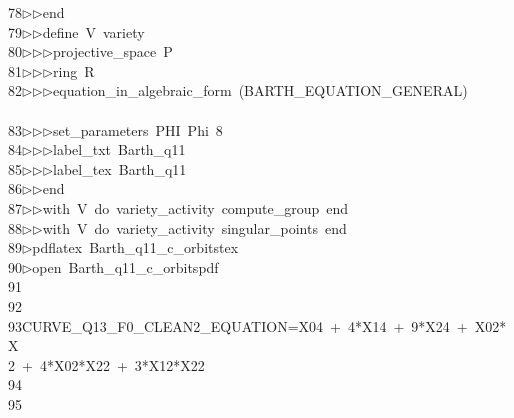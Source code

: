 \begin{tabbing}
78\>$\triangleright$\>$\triangleright$\>end\ \\[0pt]
79\>$\triangleright$\>$\triangleright$\>define\ V\ variety\ \\[0pt]
80\>$\triangleright$\>$\triangleright$\>$\triangleright$\>projective\_space\ P\ \\[0pt]
81\>$\triangleright$\>$\triangleright$\>$\triangleright$\>ring\ R\ \\[0pt]
82\>$\triangleright$\>$\triangleright$\>$\triangleright$\>equation\_in\_algebraic\_form\ (BARTH\_EQUATION\_GENERAL)\ \\[0pt]
\>\\[0pt]
83\>$\triangleright$\>$\triangleright$\>$\triangleright$\>set\_parameters\ PHI\ Phi\ 8\ \\[0pt]
84\>$\triangleright$\>$\triangleright$\>$\triangleright$\>label\_txt\ Barth\_q11\ \\[0pt]
85\>$\triangleright$\>$\triangleright$\>$\triangleright$\>label\_tex\ Barth\_q11\ \\[0pt]
86\>$\triangleright$\>$\triangleright$\>end\ \\[0pt]
87\>$\triangleright$\>$\triangleright$\>with\ V\ do\ variety\_activity\ compute\_group\ end\ \\[0pt]
88\>$\triangleright$\>$\triangleright$\>with\ V\ do\ variety\_activity\ singular\_points\ end\ \\[0pt]
89\>$\triangleright$\>pdflatex\ Barth\_q11\_c\_orbitstex\\[0pt]
90\>$\triangleright$\>open\ Barth\_q11\_c\_orbitspdf\\[0pt]
91\>\\[0pt]
92\>\\[0pt]
93\>CURVE\_Q13\_F0\_CLEAN2\_EQUATION=X04\ +\ 4*X14\ +\ 9*X24\ +\ X02*X\\[0pt]
2\ +\ 4*X02*X22\ +\ 3*X12*X22\\[0pt]
94\>\\[0pt]
95\>\\[0pt]

\end{tabbing}
